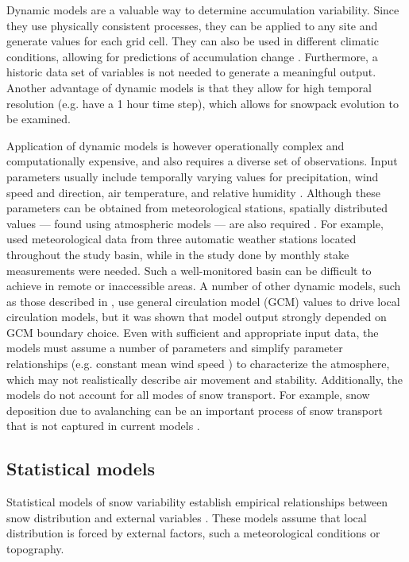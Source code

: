 \documentclass[12pt]{article}
\begin{document}
Dynamic models are a valuable way to determine accumulation variability. Since they use physically consistent processes, they can be applied to any site and generate values for each grid cell. They can also be used in different climatic conditions, allowing for predictions of accumulation change \citep{Clark2011}. Furthermore, a historic data set of variables is not needed to generate a meaningful output. Another advantage of dynamic models is that they allow for high temporal resolution (e.g. \cite{Mott2008} have a 1 hour time step), which allows for snowpack evolution to be examined.

Application of dynamic models is however operationally complex and computationally expensive, and also requires a diverse set of observations. Input parameters usually include temporally varying values for precipitation, wind speed and direction, air temperature, and relative humidity \citep{Liston2006}. Although these parameters can be obtained from meteorological stations, spatially distributed values --- found using atmospheric models --- are also required \citep{Liston2006, Mott2008}. For example, \cite{Dadic2010} used meteorological data from three automatic weather stations located throughout the study basin, while in the study done by \cite{Mott2008} monthly stake measurements were needed. Such a well-monitored basin can be difficult to achieve in remote or inaccessible areas. A number of other dynamic models, such as those described in \cite{Fowler2007}, use general circulation model (GCM) values to drive local circulation models, but it was shown that model output strongly depended on GCM boundary choice.  Even with sufficient and appropriate input data, the models must assume a number of parameters and simplify parameter relationships (e.g. constant mean wind speed \citep{Mott2008}) to characterize the atmosphere, which may not realistically describe air movement and stability. Additionally, the models do not account for all modes of snow transport. For example, snow deposition due to avalanching can be an important process of snow transport that is not captured in current models \citep{Mott2008}. 

\subsection{Statistical models}
Statistical models of snow variability establish empirical relationships between snow distribution and external variables \citep{Fowler2007}. These models assume that local distribution is forced by external factors, such a meteorological conditions or topography.
\end{document}
